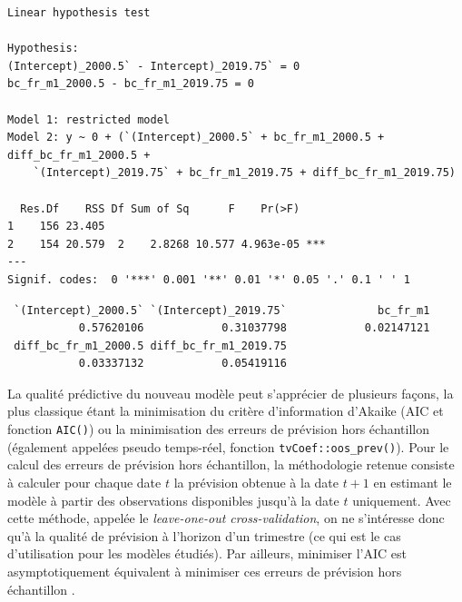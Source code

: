 \documentclass[
  a4paper,
  DIV=11,
  numbers=noendperiod,
  french]{scrartcl}
\newenvironment{Shaded}{\begin{snugshade}}{\end{snugshade}}
\newcommand{\AttributeTok}[1]{\textcolor[rgb]{0.40,0.45,0.13}{#1}}
\newcommand{\CommentTok}[1]{\textcolor[rgb]{0.37,0.37,0.37}{#1}}
\newcommand{\DecValTok}[1]{\textcolor[rgb]{0.68,0.00,0.00}{#1}}
\newcommand{\FunctionTok}[1]{\textcolor[rgb]{0.28,0.35,0.67}{#1}}
\newcommand{\NormalTok}[1]{\textcolor[rgb]{0.00,0.23,0.31}{#1}}
\newcommand{\OtherTok}[1]{\textcolor[rgb]{0.00,0.23,0.31}{#1}}
\newcommand{\SpecialCharTok}[1]{\textcolor[rgb]{0.37,0.37,0.37}{#1}}
\newcommand\1{{\mathds 1}}
\theoremstyle{remark}
\begin{document}
\begin{verbatim}
Linear hypothesis test

Hypothesis:
(Intercept)_2000.5` - Intercept)_2019.75` = 0
bc_fr_m1_2000.5 - bc_fr_m1_2019.75 = 0

Model 1: restricted model
Model 2: y ~ 0 + (`(Intercept)_2000.5` + bc_fr_m1_2000.5 + diff_bc_fr_m1_2000.5 + 
    `(Intercept)_2019.75` + bc_fr_m1_2019.75 + diff_bc_fr_m1_2019.75)

  Res.Df    RSS Df Sum of Sq      F    Pr(>F)    
1    156 23.405                                  
2    154 20.579  2    2.8268 10.577 4.963e-05 ***
---
Signif. codes:  0 '***' 0.001 '**' 0.01 '*' 0.05 '.' 0.1 ' ' 1
\end{verbatim}

\begin{Shaded}
\end{Shaded}

\begin{verbatim}
 `(Intercept)_2000.5` `(Intercept)_2019.75`              bc_fr_m1 
           0.57620106            0.31037798            0.02147121 
 diff_bc_fr_m1_2000.5 diff_bc_fr_m1_2019.75 
           0.03337132            0.05419116 
\end{verbatim}

La qualité prédictive du nouveau modèle peut s'apprécier de plusieurs
façons, la plus classique étant la minimisation du critère d'information
d'Akaike (AIC et fonction \texttt{AIC()}) ou la minimisation des erreurs
de prévision hors échantillon (également appelées pseudo temps-réel,
fonction \texttt{tvCoef::oos\_prev()}). Pour le calcul des erreurs de
prévision hors échantillon, la méthodologie retenue consiste à calculer
pour chaque date \(t\) la prévision obtenue à la date \(t+1\) en
estimant le modèle à partir des observations disponibles jusqu'à la date
\(t\) uniquement. Avec cette méthode, appelée le \emph{leave-one-out
cross-validation}, on ne s'intéresse donc qu'à la qualité de prévision à
l'horizon d'un trimestre (ce qui est le cas d'utilisation pour les
modèles étudiés). Par ailleurs, minimiser l'AIC est asymptotiquement
équivalent à minimiser ces erreurs de prévision hors échantillon
\autocite{AIC}.
\end{document}
